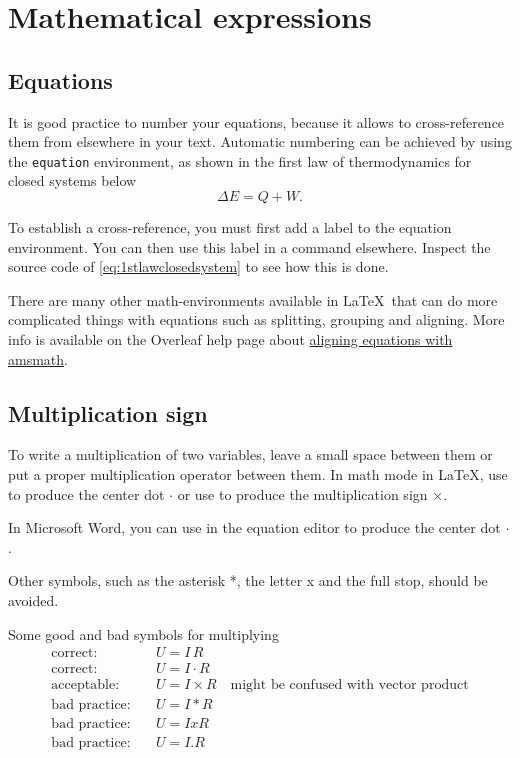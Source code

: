 \section{Mathematical expressions}\label{sec:formatmath}
\subsection{Equations}
It is good practice to number your equations, because it allows to cross-reference them from elsewhere in your text. Automatic numbering can be achieved by using the \texttt{equation} environment, as shown in the first law of thermodynamics for closed systems below
\begin{equation}\label{eq:1stlawclosedsystem}
    \Delta E = Q + W.
\end{equation}

To establish a cross-reference, you must first add a label to the equation environment. You can then use this label in a  command elsewhere. Inspect the source code of \cref{eq:1stlawclosedsystem} to see how this is done.

There are many other math-environments available in \LaTeX\ that can do more complicated things with equations such as splitting, grouping and aligning. More info is available on the Overleaf help page about \href{https://www.overleaf.com/learn/latex/Aligning_equations_with_amsmath}{aligning equations with amsmath}.

\subsection{Multiplication sign}
To write a multiplication of two variables, leave a small space between them or put a proper multiplication operator between them. In math mode in \LaTeX, use  to produce the center dot $\cdot$ or use  to produce the multiplication sign $\times$.

In Microsoft Word, you can use  in the equation editor to produce the center dot $\cdot$.

Other symbols, such as the asterisk *, the letter x and the full stop, should be avoided.
\begin{frame}[fragile]{Some good and bad symbols for multiplying}
    \begin{align*}
    \text{correct:} \quad & U = I\, R \\
    \text{correct:} \quad & U = I\cdot R\\
    \text{acceptable:} \quad & U = I\times R \quad\text{might be confused with vector product}\\
    \text{bad practice:} \quad & U = I * R \\
    \text{bad practice:} \quad & U = I x R \\
    \text{bad practice:} \quad & U = I.R
    \end{align*}
\end{frame}

